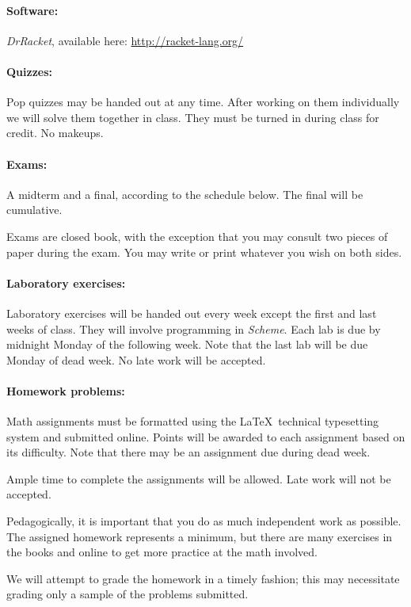 \documentclass{article}
\begin{document}
\paragraph{Software:} {\em DrRacket}, available here: 
\url{http://racket-lang.org/}

\paragraph{Quizzes:}  
Pop quizzes may be handed out at any time.  After working
on them individually we will solve them together in class.
They must be turned in during class for credit.  No makeups.

\paragraph{Exams:} A midterm and a final, according to the schedule below.
The final will be cumulative.

Exams are closed book, with the exception that you may
consult two pieces of paper during the exam.  You may write or print
whatever you wish on both sides.

\paragraph{Laboratory exercises:}
Laboratory exercises will be handed out every week except
the first and last weeks of class.  They will involve
programming in {\em Scheme}.
Each lab is due by midnight Monday of the following week.
Note that the last lab will be due Monday of dead week.
No late work will be accepted.

\paragraph{Homework problems:}
Math assignments must be formatted 
using the \LaTeX\ technical typesetting system and
submitted online. Points will be awarded to each assignment
based on its difficulty.  Note that there may be an assignment due
during dead week.

Ample time to complete the assignments will be allowed.
Late work will not be accepted.  

Pedagogically, it is important that you do as much independent work as
possible.  The assigned homework represents a minimum, but there are
many exercises in the books and online to get more practice at the
math involved.

We will attempt to grade the homework in a timely
fashion; this may necessitate grading only a sample of the problems
submitted.
\end{document}
